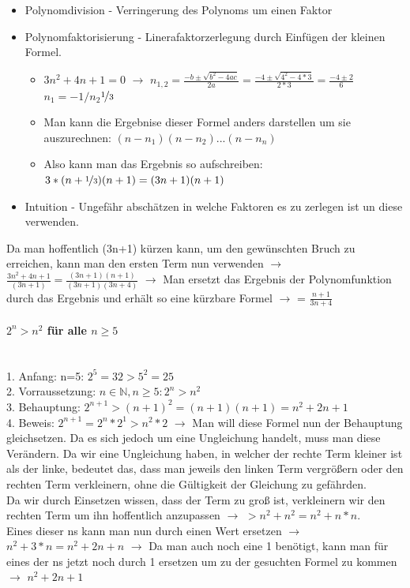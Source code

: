 \documentclass{article}
\newcommand{\paragraphlb}[1]{\paragraph{#1}\mbox{}\\}
\newcommand{\N}{\mathbb{N}}
\begin{document}
	\begin{itemize}
		\item{Polynomdivision - Verringerung des Polynoms um einen Faktor}
		\item{Polynomfaktorisierung - Linerafaktorzerlegung durch Einfügen der kleinen Formel.}
		\begin{itemize}
			\item{$3n^2+4n+1 = 0$ $\to$ $n_{1,2}=\frac{-b\pm\sqrt{b^2-4ac}}{2a} = \frac{-4\pm\sqrt{4^2-4*3}}{2*3} = \frac{-4\pm2}{6} $\to$ n_1 = -1/n_2 $\to$ \nicefrac{1}{3}$}
			\item{Man kann die Ergebnise dieser Formel anders darstellen um sie auszurechnen: $(n-n_1)(n-n_2)...(n-n_n)$}
			\item{Also kann man das Ergebnis so aufschreiben: $3*(n+\nicefrac{1}{3})(n+1)=(3n+1)(n+1)$}
		\end{itemize}
		\item{Intuition - Ungefähr abschätzen in welche Faktoren es zu zerlegen ist un diese verwenden.}
	\end{itemize}
	Da man hoffentlich (3n+1) kürzen kann, um den gewünschten Bruch zu erreichen, kann man den ersten Term nun verwenden $\to$ $\frac{3n^2+4n+1}{(3n+1)}=\frac{(3n+1)(n+1)}{(3n+1)(3n+4)}$ $\to$ Man ersetzt das Ergebnis der Polynomfunktion durch das Ergebnis und erhält so eine kürzbare Formel $\to$ = $\frac{n+1}{3n+4}$
	\paragraphlb{$2^n > n^2$ für alle $n \geq 5$}
	1. Anfang: n=5: $2^5=32 > 5^2 = 25$ \\
	2. Vorraussetzung: $n\in\N, n\geq 5:2^n>n^2$\\
	3. Behauptung: $2^{n+1} > (n+1)^2=(n+1)(n+1) = n^2+2n+1$ \\
	4. Beweis: $2^{n+1} = 2^n * 2^1 > n^2*2$ $\to$ Man will diese Formel nun der Behauptung gleichsetzen. Da es sich jedoch um eine Ungleichung handelt, muss man diese Verändern. Da wir eine Ungleichung haben, in welcher der rechte Term kleiner ist als der linke, bedeutet das, dass man jeweils den linken Term vergrößern oder den rechten Term verkleinern, ohne die Gültigkeit der Gleichung zu gefährden. \\
	Da wir durch Einsetzen wissen, dass der Term zu groß ist, verkleinern wir den rechten Term um ihn hoffentlich anzupassen $\to$ $> n^2 + n^2 = n^2+n*n$. \\
	Eines dieser ns kann man nun durch einen Wert ersetzen $\to$ $n^2+3*n = n^2+2n+n$ $\to$ Da man auch noch eine 1 benötigt, kann man für eines der ns jetzt noch durch 1 ersetzen um zu der gesuchten Formel zu kommen $\to$ $n^2+2n+1$ \\
\end{document}
